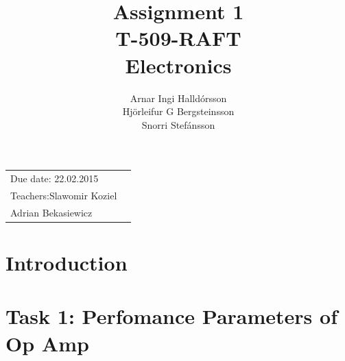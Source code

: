 \documentclass[11pt,a4paper]{article}
\title{Assignment 1 \\ T-509-RAFT \\ Electronics} %
\author{Arnar Ingi Halldórsson \\ Hjörleifur G Bergsteinsson \\ Snorri Stefánsson} %
\begin{document}
\maketitle %

\begin{tabular}{lr}
Due date: 22.02.2015 \\
Teachers:\qquad Slawomir Koziel\\ %
\qquad \qquad \qquad Adrian Bekasiewicz
\end{tabular}

\setlength\parindent{0pt} %

\renewcommand{\labelenumi}{\alph{enumi}.} %

\section*{Introduction}


\section*{Task 1: Perfomance Parameters of Op Amp}
\end{document}
